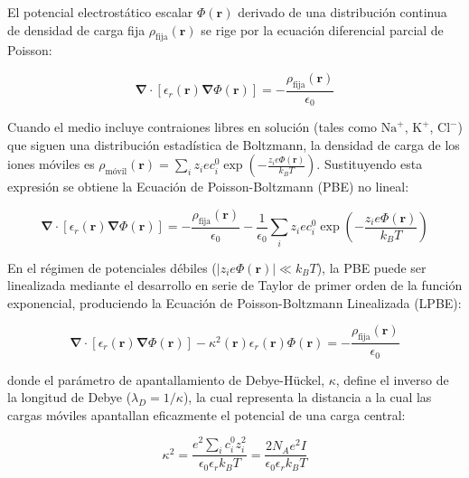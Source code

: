 \documentclass[12pt]{article}
\begin{document}
El potencial electrostático escalar $\Phi(\mathbf{r})$ derivado de una distribución continua de densidad de carga fija $\rho_{\text{fija}}(\mathbf{r})$ se rige por la ecuación diferencial parcial de Poisson:

\begin{equation}
\mathbf{\nabla} \cdot \left[ \epsilon_r(\mathbf{r}) \mathbf{\nabla} \Phi(\mathbf{r}) \right] = -\frac{\rho_{\text{fija}}(\mathbf{r})}{\epsilon_0}
\end{equation}

Cuando el medio incluye contraiones libres en solución (tales como $\text{Na}^+$, $\text{K}^+$, $\text{Cl}^-$) que siguen una distribución estadística de Boltzmann, la densidad de carga de los iones móviles es $\rho_{\text{móvil}}(\mathbf{r}) = \sum_i z_i e c_i^0 \exp\left( - \frac{z_i e \Phi(\mathbf{r})}{k_B T} \right)$. Sustituyendo esta expresión se obtiene la Ecuación de Poisson-Boltzmann (PBE) no lineal:

\begin{equation}
\mathbf{\nabla} \cdot \left[ \epsilon_r(\mathbf{r}) \mathbf{\nabla} \Phi(\mathbf{r}) \right] = -\frac{\rho_{\text{fija}}(\mathbf{r})}{\epsilon_0} - \frac{1}{\epsilon_0} \sum_i z_i e c_i^0 \exp\left( -\frac{z_i e \Phi(\mathbf{r})}{k_B T} \right)
\end{equation}

En el régimen de potenciales débiles ($|z_i e \Phi(\mathbf{r})| \ll k_B T$), la PBE puede ser linealizada mediante el desarrollo en serie de Taylor de primer orden de la función exponencial, produciendo la Ecuación de Poisson-Boltzmann Linealizada (LPBE):

\begin{equation}
\mathbf{\nabla} \cdot \left[ \epsilon_r(\mathbf{r}) \mathbf{\nabla} \Phi(\mathbf{r}) \right] - \kappa^2(\mathbf{r}) \epsilon_r(\mathbf{r}) \Phi(\mathbf{r}) = -\frac{\rho_{\text{fija}}(\mathbf{r})}{\epsilon_0}
\end{equation}

donde el parámetro de apantallamiento de Debye-Hückel, $\kappa$, define el inverso de la longitud de Debye ($\lambda_D = 1/\kappa$), la cual representa la distancia a la cual las cargas móviles apantallan eficazmente el potencial de una carga central:

\begin{equation}
\kappa^2 = \frac{e^2 \sum_i c_i^0 z_i^2}{\epsilon_0 \epsilon_r k_B T} = \frac{2 N_A e^2 I}{\epsilon_0 \epsilon_r k_B T}
\end{equation}
\end{document}
